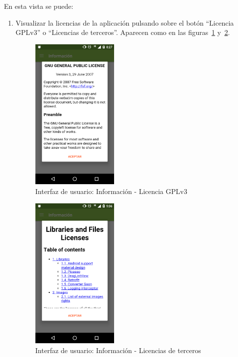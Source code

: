 En esta vista se puede:
\begin{enumerate}
\item Visualizar la licencias de la aplicación pulsando sobre el botón
  ``Licencia GPLv3'' o ``Licencias de terceros''. Aparecen como en las
  figuras~\ref{fig:captura_29} y~\ref{fig:captura_30}.

\begin{figure}[htbp]
  \centering
  \includegraphics[width=0.4\textwidth]{cap5/img/captura_29}
  \caption{Interfaz de usuario: Información - Licencia GPLv3}
  \label{fig:captura_29}
\end{figure}

\begin{figure}[htbp]
  \centering
  \includegraphics[width=0.4\textwidth]{cap5/img/captura_30}
  \caption{Interfaz de usuario: Información - Licencias de terceros}
  \label{fig:captura_30}
\end{figure}

\end{enumerate}
